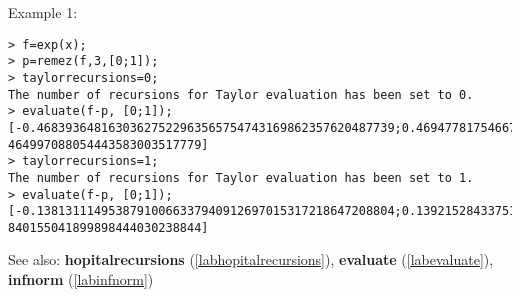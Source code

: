 \noindent Example 1: 
\begin{center}\begin{minipage}{15cm}\begin{Verbatim}[frame=single]
> f=exp(x);
> p=remez(f,3,[0;1]);
> taylorrecursions=0;
The number of recursions for Taylor evaluation has been set to 0.
> evaluate(f-p, [0;1]);
[-0.46839364816303627522963565754743169862357620487739;0.46947781754667086491682
464997088054443583003517779]
> taylorrecursions=1;
The number of recursions for Taylor evaluation has been set to 1.
> evaluate(f-p, [0;1]);
[-0.13813111495387910066337940912697015317218647208804;0.13921528433751369035056
840155041899898444030238844]
\end{Verbatim}
\end{minipage}\end{center}
See also: \textbf{hopitalrecursions} (\ref{labhopitalrecursions}), \textbf{evaluate} (\ref{labevaluate}), \textbf{infnorm} (\ref{labinfnorm})
